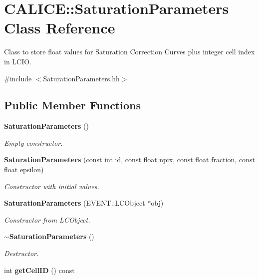 \section{CALICE::SaturationParameters Class Reference}
\label{classCALICE_1_1SaturationParameters}


Class to store float values for Saturation Correction Curves plus integer cell index in LCIO.  


{\ttfamily \#include $<$SaturationParameters.hh$>$}\subsection*{Public Member Functions}
\begin{DoxyCompactItemize}
\item 
{\bf SaturationParameters} ()\label{classCALICE_1_1SaturationParameters_a6bcce091aa42264d16ef47dcd08e821c}

\begin{DoxyCompactList}\small\item\em Empty constructor. \item\end{DoxyCompactList}\item 
{\bf SaturationParameters} (const int id, const float npix, const float fraction, const float epsilon)\label{classCALICE_1_1SaturationParameters_ac81175a971ef70d31a35736b67f2bf21}

\begin{DoxyCompactList}\small\item\em Constructor with initial values. \item\end{DoxyCompactList}\item 
{\bf SaturationParameters} (EVENT::LCObject $\ast$obj)\label{classCALICE_1_1SaturationParameters_a0b239df29e12436f287567b36b0764c7}

\begin{DoxyCompactList}\small\item\em Constructor from LCObject. \item\end{DoxyCompactList}\item 
{\bf $\sim$SaturationParameters} ()\label{classCALICE_1_1SaturationParameters_ad14c91e7e73ffb8760d28a4d03111e18}

\begin{DoxyCompactList}\small\item\em Destructor. \item\end{DoxyCompactList}\item 
int {\bf getCellID} () const \label{classCALICE_1_1SaturationParameters_a5c652e82d47d3d527bab74c7cfcfc33e}


\end{DoxyCompactItemize}
